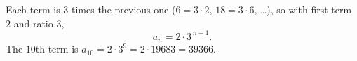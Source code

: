 Each term is $3$ times the previous one ($6=3\cdot2$, $18=3\cdot6$, \dots), so with first term $2$ and ratio $3$,
\[
a_n=2\cdot3^{\,n-1}.
\]
The $10$th term is $a_{10}=2\cdot3^9=2\cdot19683=\boxed{39366}$.
